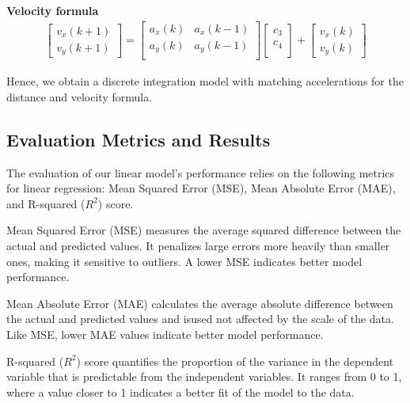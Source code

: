 \hfil

\textbf{Velocity formula}
\begin{align}
\label{eq:velocity_matrix}
    \begin{bmatrix} v_x(k+1) \\ v_y(k+1) \end{bmatrix}
    =
    \begin{bmatrix} a_x(k) & a_x(k-1)    \\ a_y(k) & a_y(k-1)    \\ \end{bmatrix}
    \begin{bmatrix} c_3 \\ c_4 \\ \end{bmatrix}
    +
    \begin{bmatrix} v_x(k) \\ v_y(k) \end{bmatrix}
\end{align}


Hence, we obtain a discrete integration model with matching accelerations for the distance and velocity formula.

\subsection{Evaluation Metrics and Results}

The evaluation of our linear model's performance relies on the following metrics for linear regression: Mean Squared Error (MSE), Mean Absolute Error (MAE), and R-squared ($R^2$) score.

Mean Squared Error (MSE) measures the average squared difference between the actual and predicted values. It penalizes large errors more heavily than smaller ones, making it sensitive to outliers. A lower MSE indicates better model performance.

Mean Absolute Error (MAE) calculates the average absolute difference between the actual and predicted values and isused  
not affected by the scale of the data. Like MSE, lower MAE values indicate better model performance.

R-squared ($R^2$) score quantifies the proportion of the variance in the dependent variable that is predictable 
from the independent variables. 
It ranges from 0 to 1, where a value closer to 1 indicates a better fit of the model to the data. 

